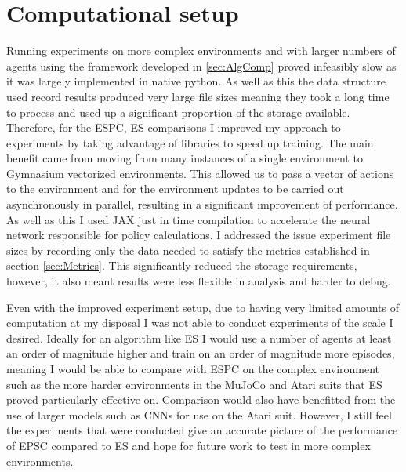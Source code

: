 \section{Computational setup}
Running experiments on more complex environments and with larger numbers of agents using the framework developed in \ref{sec:AlgComp} proved infeasibly slow as it was largely implemented in native python. As well as this the data structure used record results produced very large file sizes meaning they took a long time to process and used up a significant proportion of the storage available. Therefore, for the ESPC, ES comparisons I improved my approach to experiments by taking advantage of libraries to speed up training. The main benefit came from moving from many instances of a single environment to Gymnasium vectorized environments. This allowed us to pass a vector of actions to the environment and for the environment updates to be carried out asynchronously in parallel, resulting in a significant improvement of performance. As well as this I used JAX \cite{JAX} just in time compilation to accelerate the neural network responsible for policy calculations. I addressed the issue experiment file sizes by recording only the data needed to satisfy the metrics established in section \ref{sec:Metrics}. This significantly reduced the storage requirements, however, it also meant results were less flexible in analysis and harder to debug.

Even with the improved experiment setup, due to having very limited amounts of computation at my disposal I was not able to conduct experiments of the scale I desired. Ideally for an algorithm like ES I would use a number of agents at least an order of magnitude higher and train on an order of magnitude more episodes, meaning I would be able to compare with ESPC on the complex environment such as the more harder environments in the MuJoCo \cite{MuJoCo} and Atari \cite{Atari} suits that ES proved particularly effective on. Comparison would also have benefitted from the use of larger models such as CNNs for use on the Atari suit. However, I still feel the experiments that were conducted give an accurate picture of the performance of EPSC compared to ES and hope for future work to test in more complex environments.

